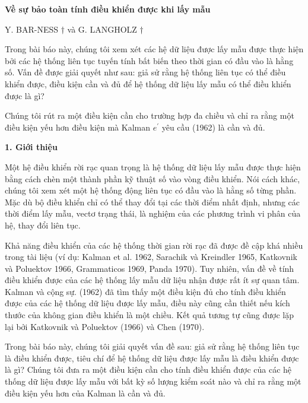 \documentclass[12pt,a4paper]{article}
\begin{document}
	\fontsize{14pt}{22pt}\selectfont


\begin{center}
	\textbf{Về sự bảo toàn tính điều khiển được khi lấy mẫu}
\end{center}

\begin{center}
	Y. BAR-NESS $\dagger$ và G. LANGHOLZ $\dagger$
\end{center}

Trong bài báo này, chúng tôi xem xét các hệ dữ liệu được lấy mẫu được thực hiện bởi các hệ thống liên tục tuyến tính bất biến theo thời gian có đầu vào là hằng số. Vấn đề được giải quyết như sau: giả sử rằng hệ thống liên tục có thể điều khiển được, điều kiện cần và đủ để hệ thống dữ liệu lấy mẫu có thể điều khiển được là gì?

Chúng tôi rút ra một điều kiện cần cho trường hợp đa chiều và chỉ ra rằng một điều kiện yếu hơn điều kiện mà Kalman $e^{\prime}$ yêu cầu (1962) là cần và đủ.


\textbf{1. Giới thiệu}

Một hệ điều khiển rời rạc quan trọng là hệ thống dữ liệu lấy mẫu được thực hiện bằng cách chèn một thành phần kỹ thuật số vào vòng điều khiển. Nói cách khác, chúng tôi xem xét một hệ thống động liên tục có đầu vào là hằng số từng phần. Mặc dù bộ điều khiển chỉ có thể thay đổi tại các thời điểm nhất định, nhưng các thời điểm lấy mẫu, vectơ trạng thái, là nghiệm của các phương trình vi phân của hệ, thay đổi liên tục.

Khả năng điều khiển của các hệ thống thời gian rời rạc đã được đề cập khá nhiều trong tài liệu (ví dụ: Kalman et al. 1962, Sarachik và Kreindler 1965, Katkovnik và Poluektov 1966, Grammaticos 1969, Panda 1970). Tuy nhiên, vấn đề về tính điều khiển được của các hệ thống lấy mẫu dữ liệu nhận được rất ít sự quan tâm. Kalman và cộng sự. (1962) đã tìm thấy một điều kiện đủ cho tính điều khiển được của các hệ thống dữ liệu được lấy mẫu, điều này cũng cần thiết nếu kích thước của không gian điều khiển là một chiều. Kết quả tương tự cũng được lặp lại bởi Katkovnik và Poluektov (1966) và Chen (1970).

Trong bài báo này, chúng tôi giải quyết vấn đề sau: giả sử rằng hệ thống liên tục là điều khiển được, tiêu chí để hệ thống dữ liệu được lấy mẫu là điều khiển được là gì? Chúng tôi đưa ra một điều kiện cần  cho tính điều khiển được của các hệ thống dữ liệu được lấy mẫu với bất kỳ số lượng kiểm soát nào và chỉ ra rằng một điều kiện yếu hơn của Kalman là cần và đủ.
\end{document}
